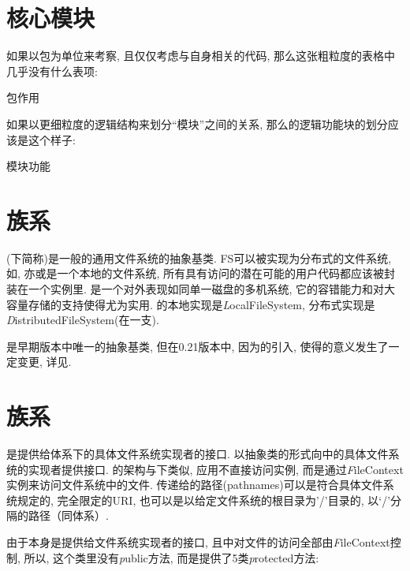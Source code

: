 \section{核心模块}
\label{sec:hfs:modules}

如果以包为单位来考察{\HFS}, 且仅仅考虑与{\HFS}自身相关的代码,
那么这张粗粒度的表格中几乎没有什么表项:
\begin{XeDuoLineTabular}{包}{作用}
\end{XeDuoLineTabular}

如果以更细粒度的逻辑结构来划分``模块''之间的关系, 那么{\HFS}的逻辑功能块的划分应该是这个样子:
\begin{XeDuoLineTabular}{模块}{功能}
\end{XeDuoLineTabular}

\section{{\FiS}族系}
\label{sec:hfs:fs}

{\FiS}(下简称{\FS})是一般的通用文件系统的抽象基类.
FS可以被实现为分布式的文件系统, 如{\HDFS}, 亦或是一个本地的文件系统,
所有具有访问{\HDFS}的潜在可能的用户代码都应该被封装在一个{\FiS}实例里.
{\HDFS}是一个对外表现如同单一磁盘的多机系统,
它的容错能力和对大容量存储的支持使得{\HDFS}尤为实用.
{\FiS}的本地实现是{\emph LocalFileSystem},
分布式实现是{\emph DistributedFileSystem}(在{\HDFS}一支).

{\FiS}是{\HadoopFS}早期版本中唯一的抽象基类, 但在0.21版本中,
因为{\AbsFS}的引入, 使得{\FiS}的意义发生了一定变更,
详见.

\section{\AbsFS 族系}
\label{sec:hfs:afs}

{\AbsFS}是提供给{\HadoopFS}体系下的具体文件系统实现者的接口.
{\AbsFS}以抽象类的形式向{\HadoopFS}中的具体文件系统的实现者提供接口.
{\HadoopFS}的架构与{\Unix}下{\VFS}类似,
应用不直接访问{\AbsFS}实例, 而是通过{\emph FileContext}实例来访问文件系统中的文件.
传递给{\AbsFS}的路径(pathnames)可以是符合具体文件系统规定的, 完全限定的URI,
也可以是以给定文件系统的根目录为'/'目录的, 以‘/’分隔的路径（同{\Unix}体系）.

由于{\AbsFS}本身是提供给文件系统实现者的接口,
且{\HadoopFS}中对文件的访问全部由{\emph FileContext}控制,
所以, 这个类里没有{\emph public}方法, 而是提供了5类{\emph protected}方法:

